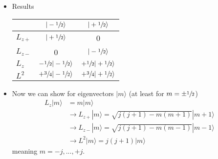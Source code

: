 \documentclass[../main.tex]{subfiles}
\begin{document}
\begin{itemize}
\item Results
\begin{center}
\begin{tabular}{ l c c }
\hline\hline
         & $|-\sfrac{1}{2}\rangle$ & $|+\sfrac{1}{2}\rangle$\\ \hline\hline
$L_{z+}$ & $|+\sfrac{1}{2}\rangle$ & 0 \\ 
$L_{z-}$ & 0 & $|-\sfrac{1}{2}\rangle$ \\ 
$L_{z}$  & $-\sfrac{1}{2}|-\sfrac{1}{2}\rangle$ & $+\sfrac{1}{2}|+\sfrac{1}{2}\rangle$\\ 
$L^2$    & $+\sfrac{3}{4}|-\sfrac{1}{2}\rangle$ & $+\sfrac{3}{4}|+\sfrac{1}{2}\rangle$\\ 
\end{tabular}
\end{center}
\item Now we can show for eigenvectors $|m\rangle$ (at least for $m=\pm\sfrac{1}{2}$)
\begin{align}
L_z|m\rangle&=m|m\rangle\\
&\rightarrow L_{z+}|m\rangle =\sqrt{j(j+1)-m(m+1)}|m+1\rangle \\
&\rightarrow L_{z-}|m\rangle =\sqrt{j(j+1)-m(m-1)}|m-1\rangle \\
&\rightarrow L^2|m\rangle =j(j+1)|m\rangle 
\end{align}
meaning $m=-j,...,+j$.
\end{itemize}
\end{document}
